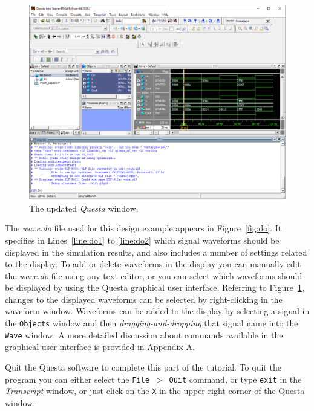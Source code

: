 \documentclass[11pt, twoside, pdftex]{article}
\begin{document}
\begin{figure}[t]
	\begin{center}
		\includegraphics[width = .85\textwidth]{figures/gui2.png}
	\end{center}
		  \caption{The updated {\it Questa} window.}
	\label{fig:gui2}
\end{figure}
\newpage
\clearpage
\noindent
The {\it wave.do} file used for this design example appears in Figure~\ref{fig:do}. 
It specifies in Lines~\ref{line:do1} to \ref{line:do2}
which signal waveforms should be displayed in the simulation results, and 
also includes a number of settings related to the display. To add or delete waveforms 
in the display you can manually edit the {\it wave.do} file using any text editor, 
or you can select which waveforms should be displayed by using the Questa graphical 
user interface. Referring to Figure~\ref{fig:gui2}, changes to the displayed waveforms 
can be selected by right-clicking in the waveform window. Waveforms can be added to 
the display by selecting a signal in the \texttt{Objects} window and then 
{\it dragging-and-dropping} that signal name into the \texttt{Wave} window. 
A more detailed discussion about commands
available in the graphical user interface is provided in Appendix A.

\noindent
Quit the Questa software to complete this part of the tutorial. To quit the program you 
can either select the \texttt{File}~$>$~\texttt{Quit} command, or 
type \texttt{exit} in the {\it Transcript}
window, or just click on the \texttt{X} in the upper-right corner of the Questa window.
\end{document}
